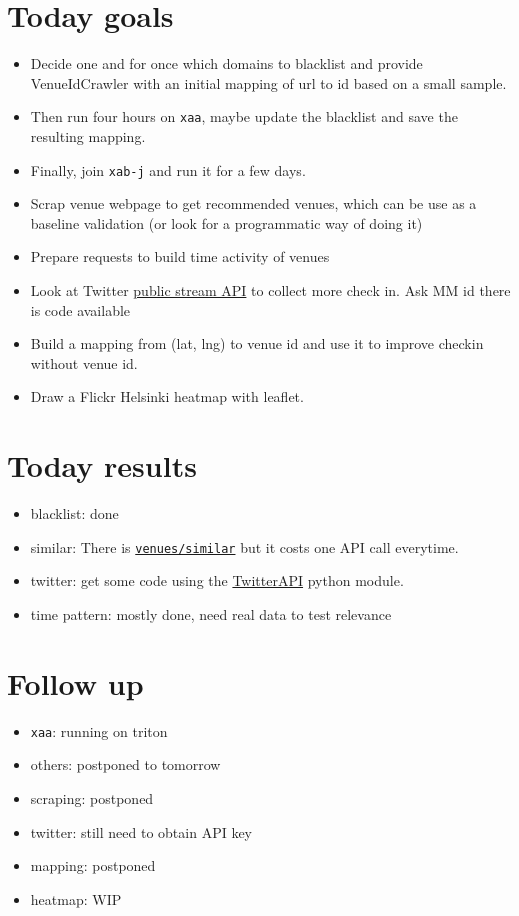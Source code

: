 \section*{Today goals}
\begin{itemize}
	\item Decide one and for once which domains to blacklist and provide
        VenueIdCrawler with an initial mapping of url to id based on a small
        sample.
    \item Then run four hours on \texttt{xaa}, maybe update the blacklist and
        save the resulting mapping.
    \item Finally, join \texttt{xab-j} and run it for a few days.
	\item Scrap venue webpage to get recommended venues, which can be use as a
        baseline validation (or look for a programmatic way of doing it)
	\item Prepare requests to build time activity of venues
    \item Look at Twitter
        \href{https://dev.twitter.com/docs/streaming-apis/streams/public}{public
        stream API} to collect more check in. Ask MM id there is code available
    \item Build a mapping from (lat, lng) to venue id and use it to improve
        checkin without venue id.
	\item Draw a Flickr Helsinki heatmap with leaflet.
\end{itemize}

\section*{Today results}
\begin{itemize}
    \item blacklist: done
    \item similar: There is
        \texttt{\href{https://developer.foursquare.com/docs/venues/similar}{venues/similar}}
        but it costs one API call everytime.
    \item twitter: get some code using the
        \href{https://github.com/geduldig/TwitterAPI}{TwitterAPI} python
        module.
    \item time pattern: mostly done, need real data to test relevance
\end{itemize}

\section*{Follow up}
\begin{itemize}
	\item \texttt{xaa}: running on triton
	\item others: postponed to tomorrow
	\item scraping: postponed
	\item twitter: still need to obtain API key
	\item mapping: postponed
	\item heatmap: WIP
\end{itemize}

